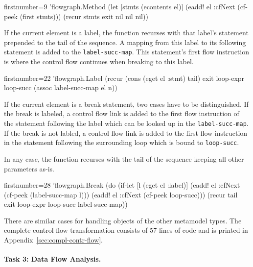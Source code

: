 \documentclass[submission]{eptcs}
\begin{document}
\begin{clojurecode*}{firstnumber=9}
        'flowgraph.Method (let [stmts (econtents el)]
                            (eadd! el :cfNext (cf-peek (first stmts)))
                            (recur stmts exit nil nil nil))
\end{clojurecode*}

If the current element is a label, the function recurses with that label's
statement prepended to the tail of the sequence.  A mapping from this label to
its following statement is added to the \verb|label-succ-map|.  This
statement's first flow instruction is where the control flow continues when
breaking to this label.

\begin{clojurecode*}{firstnumber=22}
        'flowgraph.Label (recur (cons (eget el :stmt) tail) exit loop-expr loop-succ
                                (assoc label-succ-map el n))
\end{clojurecode*}

If the current element is a break statement, two cases have to be
distinguished.  If the break is labeled, a control flow link is added to the
first flow instruction of the statement following the label which can be looked
up in the \verb|label-succ-map|.  If the break is not labled, a control flow
link is added to the first flow instruction in the statement following the
surrounding loop which is bound to \verb|loop-succ|.

In any case, the function recurses with the tail of the sequence keeping all
other parameters as-is.

\begin{clojurecode*}{firstnumber=28}
        'flowgraph.Break (do (if-let [l (eget el :label)]
                               (eadd! el :cfNext (cf-peek (label-succ-map l)))
                               (eadd! el :cfNext (cf-peek loop-succ)))
                           (recur tail exit loop-expr loop-succ label-succ-map))
\end{clojurecode*}

There are similar cases for handling objects of the other metamodel types.  The
complete control flow transformation consists of 57 lines of code and is
printed in Appendix~\ref{sec:compl-contr-flow}.


\paragraph{Task 3: Data Flow Analysis.}
\label{sec:task-3}
\end{document}
